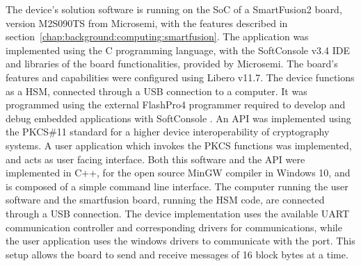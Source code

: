 The device's solution software is running on the \ac{SoC} of a SmartFusion2 board, version M2S090TS from Microsemi, with the features described in section~\ref{chap:background:computing:smartfusion}.
The application was implemented using the C programming language, with the SoftConsole v3.4 \ac{IDE} and libraries of the board functionalities, provided by Microsemi. The board's features and capabilities were configured using Libero v11.7.
The device functions as a \ac{HSM}, connected through a \ac{USB} connection to a computer. It was programmed using the external FlashPro4 programmer required to develop and debug embedded applications with SoftConsole \cite{smartfusionSecurityPractices}.
An API was implemented using the \ac{PKCS}\#11 standard for a higher device interoperability of cryptography systems. A user application which invokes the PKCS functions was implemented, and acts as user facing interface. Both this software and the API were implemented in C++, for the open source MinGW compiler in Windows 10, and is composed of a simple command line interface.
The computer running the user software and the smartfusion board, running the HSM code, are connected through a \ac{USB} connection.
The device implementation uses the available \ac{UART} communication controller and corresponding drivers for communications, while the user application uses the windows drivers to communicate with the port.
This setup allows the board to send and receive messages of 16 block bytes at a time.

